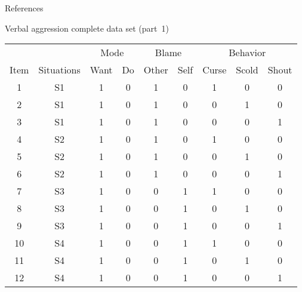 \documentclass[aspectratio=169]{beamer}
\begin{document}
\begin{frame}[allowframebreaks]{References}


\end{frame}



\maketitle



\begin{frame}[fragile]{Verbal aggression complete data set (part~1)}
\scriptsize
\begin{tabular}{ccccccccc}\hline
&&\multicolumn{2}{c}{Mode} & 
  \multicolumn{2}{c}{Blame} & 
  \multicolumn{3}{c}{Behavior}\\\cline{3-9}
Item & Situations &
Want & Do & Other &
Self & Curse & Scold & Shout\\\hline
 1 & S1 & 1 & 0 & 1 & 0 & 1 & 0 & 0 \\
 2 & S1 & 1 & 0 & 1 & 0 & 0 & 1 & 0 \\
 3 & S1 & 1 & 0 & 1 & 0 & 0 & 0 & 1 \\
 4 & S2 & 1 & 0 & 1 & 0 & 1 & 0 & 0 \\
 5 & S2 & 1 & 0 & 1 & 0 & 0 & 1 & 0 \\
 6 & S2 & 1 & 0 & 1 & 0 & 0 & 0 & 1 \\
 7 & S3 & 1 & 0 & 0 & 1 & 1 & 0 & 0 \\
 8 & S3 & 1 & 0 & 0 & 1 & 0 & 1 & 0 \\
 9 & S3 & 1 & 0 & 0 & 1 & 0 & 0 & 1 \\
10 & S4 & 1 & 0 & 0 & 1 & 1 & 0 & 0 \\
11 & S4 & 1 & 0 & 0 & 1 & 0 & 1 & 0 \\
12 & S4 & 1 & 0 & 0 & 1 & 0 & 0 & 1 \\\hline
\end{tabular}

\end{frame}
\end{document}
